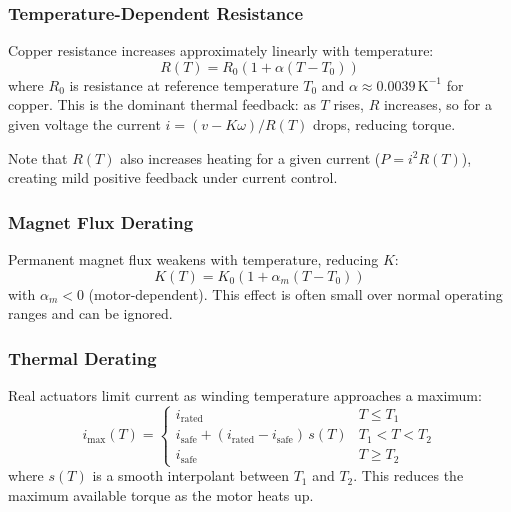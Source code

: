 \documentclass[10pt, a4paper, twocolumn]{article}
\begin{document}
\subsubsection{Temperature-Dependent Resistance}
\label{sec:resistance_temperature}

Copper resistance increases approximately linearly with temperature:
\begin{equation}
  R(T) = R_0 \left(1 + \alpha (T - T_0)\right)
  \label{eq:resistance_temperature}
\end{equation}
where $R_0$ is resistance at reference temperature $T_0$ and $\alpha \approx 0.0039 \, \text{K}^{-1}$ for copper. This is the dominant thermal feedback: as $T$ rises, $R$ increases, so for a given voltage the current $i = (v - K \omega) / R(T)$ drops, reducing torque.

Note that $R(T)$ also increases heating for a given current ($P = i^2 R(T)$), creating mild positive feedback under current control.

\subsubsection{Magnet Flux Derating}
\label{sec:magnet_derating}

Permanent magnet flux weakens with temperature, reducing $K$:
\begin{equation*}
  K(T) = K_0 \left(1 + \alpha_m (T - T_0)\right)
  \label{eq:kt_temperature}
\end{equation*}
with $\alpha_m < 0$ (motor-dependent). This effect is often small over normal operating ranges and can be ignored.

\subsubsection{Thermal Derating}
\label{sec:thermal_derating}

Real actuators limit current as winding temperature approaches a maximum:
\begin{equation*}
  i_{\max}(T) = \begin{cases}
    i_{\text{rated}} & T \le T_1 \\
    i_{\text{safe}} + (i_{\text{rated}} - i_{\text{safe}}) \, s(T) & T_1 < T < T_2 \\
    i_{\text{safe}} & T \ge T_2
  \end{cases}
\end{equation*}
where $s(T)$ is a smooth interpolant between $T_1$ and $T_2$. This reduces the maximum available torque as the motor heats up.
\end{document}
